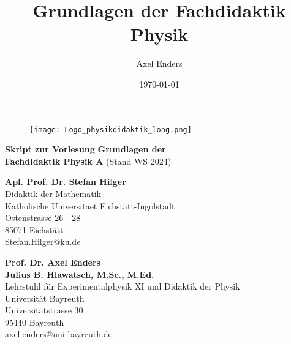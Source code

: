 \documentclass[11pt,a4paper]{book}
\title{Grundlagen der Fachdidaktik Physik}
\author{Axel Enders}
\date{\today}
\begin{document}
\begin{titlepage}
	\vs{0.5cm}
	\begin{figure}[h]
	\centering
	\texttt{[image: Logo\_physikdidaktik\_long.png]}
	\label{fig:Logo}
	\end{figure}
	
	\vs{1cm}
	\begin{center}
	\Large \textbf{Skript zur Vorlesung}
	\bip\bip
	\Huge \textbf{Grundlagen der \\ Fachdidaktik  Physik A}
	\bip\bip
	\Large
	(Stand WS 2024)
	\end{center}

	\vs{6cm}

	\begin{flushright}
		\textbf{Apl. Prof. Dr. Stefan Hilger} \\
			Didaktik der Mathematik  \\
			Katholische Universitaet Eichst\"att-Ingolstadt \\
			Ostenstrasse 26 - 28  \\
			85071 Eichst\"att \\
			Stefan.Hilger@ku.de \\

	\vs{0.5cm}

		\textbf{Prof. Dr. Axel Enders} \\
		\textbf{Julius B. Hlawatsch, M.Sc., M.Ed.}\\
		Lehrstuhl f\"ur Experimentalphysik XI und Didaktik der Physik  \\
		Universit\"at Bayreuth  \\
		Universit\"atstrasse 30  \\
		95440 Bayreuth  \\
		axel.enders@uni-bayreuth.de
	\end{flushright}

\end{titlepage}

\newpage
\end{document}
